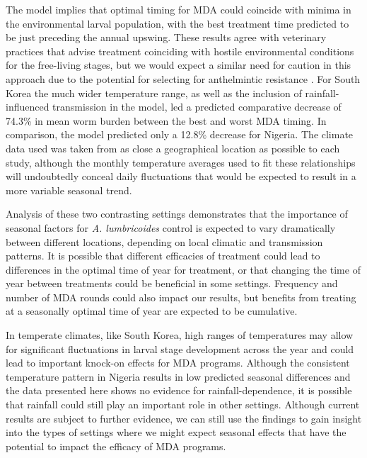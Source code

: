 The model implies that optimal timing for MDA could coincide with minima in the environmental larval population, with the best treatment time predicted to be just preceding the annual upswing. These results agree with veterinary practices that advise treatment coinciding with hostile environmental conditions for the free-living stages, but we would expect a similar need for caution in this approach due to the potential for selecting for anthelmintic resistance \cite{Vercruysse}. For South Korea the much wider temperature range, as well as the inclusion of rainfall-influenced transmission in the model, led a predicted comparative decrease of 74.3\% in mean worm burden between the best and worst MDA timing. In comparison, the model predicted only a 12.8\% decrease for Nigeria. The climate data used was taken from as close a geographical location as possible to each study, although the monthly temperature averages used to fit these relationships will undoubtedly conceal daily fluctuations that would be expected to result in a more variable seasonal trend.

Analysis of these two contrasting settings demonstrates that the importance of seasonal factors for \textit{A. lumbricoides} control is expected to vary dramatically between different locations, depending on local climatic and transmission patterns. It is possible that different efficacies of treatment could lead to differences in the optimal time of year for treatment, or that changing the time of year between treatments could be beneficial in some settings. Frequency and number of MDA rounds could also impact our results, but benefits from treating at a seasonally optimal time of year are expected to be cumulative.

In temperate climates, like South Korea, high ranges of temperatures may allow for significant fluctuations in larval stage development across the year and could lead to important knock-on effects for MDA programs. Although the consistent temperature pattern in Nigeria results in low predicted seasonal differences and the data presented here shows no evidence for rainfall-dependence, it is possible that rainfall could still play an important role in other settings. Although current results are subject to further evidence, we can still use the findings to gain insight into the types of settings where we might expect seasonal effects that have the potential to impact the efficacy of MDA programs.

